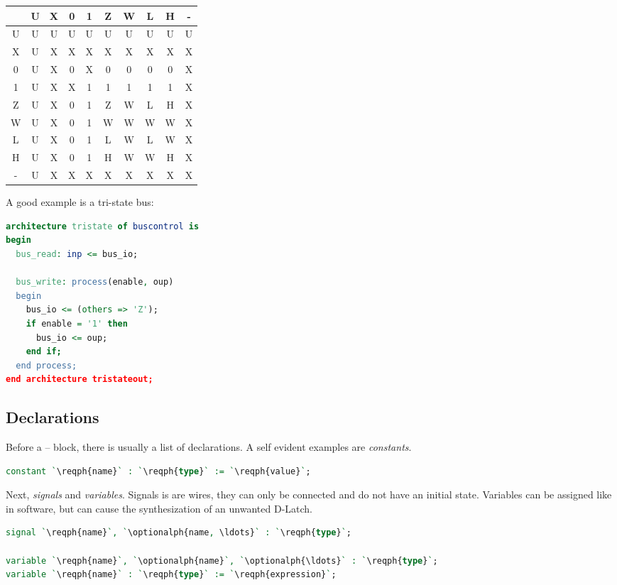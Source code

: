 \begin{center}
  \ttfamily
  \begin{tabular}{c|ccccccccc}
    \toprule
      & U & X & 0 & 1 & Z & W & L & H & - \\
    \midrule
    U & U & U & U & U & U & U & U & U & U \\
    X & U & X & X & X & X & X & X & X & X \\
    0 & U & X & 0 & X & 0 & 0 & 0 & 0 & X \\
    1 & U & X & X & 1 & 1 & 1 & 1 & 1 & X \\
    Z & U & X & 0 & 1 & Z & W & L & H & X \\
    W & U & X & 0 & 1 & W & W & W & W & X \\
    L & U & X & 0 & 1 & L & W & L & W & X \\
    H & U & X & 0 & 1 & H & W & W & H & X \\
    - & U & X & X & X & X & X & X & X & X \\
    \bottomrule
  \end{tabular}
\end{center}
A good example is a tri-state bus: 
\begin{lstlisting}[language=vhdl]
architecture tristate of buscontrol is
begin
  bus_read: inp <= bus_io;

  bus_write: process(enable, oup)
  begin
    bus_io <= (others => 'Z');
    if enable = '1' then
      bus_io <= oup;
    end if;
  end process;
end architecture tristateout;
\end{lstlisting}

\subsection{Declarations} \label{sec:declarations}
Before a  --  block, there is usually a list of declarations.
A self evident examples are \emph{constants}.
\begin{lstlisting}[language=vhdl]
constant `\reqph{name}` : `\reqph{type}` := `\reqph{value}`;
\end{lstlisting}

Next, \emph{signals} and \emph{variables}. Signals is are wires, they can only be
connected and do not have an initial state. Variables can be assigned like in
software, but can cause the synthesization of an unwanted D-Latch.

\begin{lstlisting}[language=vhdl]
signal `\reqph{name}`, `\optionalph{name, \ldots}` : `\reqph{type}`;

variable `\reqph{name}`, `\optionalph{name}`, `\optionalph{\ldots}` : `\reqph{type}`;
variable `\reqph{name}` : `\reqph{type}` := `\reqph{expression}`;
\end{lstlisting}

